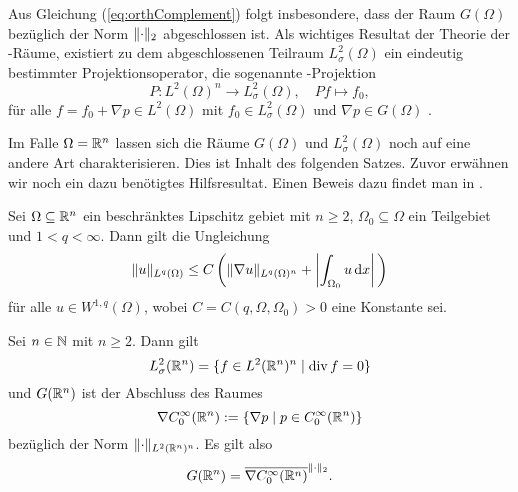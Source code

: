 Aus Gleichung (\ref{eq:orthComplement}) folgt insbesondere, dass der Raum $G(\Omega)$ bezüglich der Norm $\lVert \cdot \rVert_2$ abgeschlossen ist.
Als wichtiges Resultat der Theorie der \hilbert\hyp{}Räume, existiert zu dem abgeschlossenen Teilraum $L_\sigma^2(\Omega)$ ein eindeutig bestimmter Projektionsoperator, die sogenannte \helmholtz\hyp{}Projektion
$$
P \colon L^2(\Omega)^n \to L_\sigma^2(\Omega),\quad Pf \mapsto f_0,
$$
für alle $f = f_0 + \nabla p \in L^2(\Omega)$ mit $f_0 \in L_\sigma^2(\Omega)$ und $\nabla p \in G(\Omega)$ \cite[S.226f., Theorem V.3.4]{werner2011fa}.

Im Falle $\Omega = \mathbb{R}^n$ lassen sich die Räume $G(\Omega)$ und $L_\sigma^2(\Omega)$ noch auf eine andere Art charakterisieren.
Dies ist Inhalt des folgenden Satzes.
Zuvor erwähnen wir noch ein dazu benötigtes Hilfsresultat.
Einen Beweis dazu findet man in \cite[S.44, Lemma 1.1.2]{sohr2001navier}.

\begin{lem}
  Sei $\Omega \subseteq \mathbb{R}^n$ ein beschränktes Lipschitz gebiet mit $n \geq 2$, $\Omega_0 \subseteq \Omega$ ein Teilgebiet und $1 < q < \infty$.
  Dann gilt die Ungleichung
  $$
  \lVert u \rVert_{L^q(\Omega)} \leq C \left( \lVert \nabla u \rVert_{L^q(\Omega)^n} + \left| \int_{\Omega_0} u \, {\operatorname{d}\!{x}} \right|\, \right)
  $$
  für alle $u \in W^{1,q}(\Omega)$, wobei $C = C(q,\Omega, \Omega_0) > 0$ eine Konstante sei.
  \label{lem:poincare2}
\end{lem}

\begin{thm}
  Sei $n \in \mathbb{N}$ mit $n \geq 2$.
  Dann gilt
  \begin{equation}
    \label{eq:LCharacterization}
    L_\sigma^2(\mathbb{R}^n) = \{ f \in L^2(\mathbb{R}^n)^n \mid \mathrm{div\,} f = 0 \}
  \end{equation}
  und $G(\mathbb{R}^n)$ ist der Abschluss des Raumes
  $$
  \nabla C_0^\infty(\mathbb{R}^n) := \{ \nabla p \mid p \in C_0^\infty(\mathbb{R}^n) \}
  $$
  bezüglich der Norm $\lVert \cdot \rVert_{L^2(\mathbb{R}^n)^n}$.
  Es gilt also
  \begin{equation}
    \label{eq:GCharacterization}
    G(\mathbb{R}^n) = \overline{\nabla C_0^\infty(\mathbb{R}^n)}^{\lVert \cdot \rVert_2}.
  \end{equation}
\end{thm}

